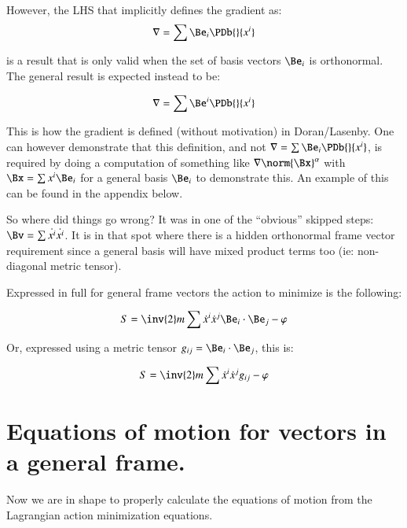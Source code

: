 However, the LHS that implicitly defines the gradient as:
\begin{equation*}
\grad = \sum \Be_i \PDb{}{x^i}
\end{equation*}

is a result that is only valid when the set of basis vectors $\Be_i$ is orthonormal.  The general result is
expected instead to be:

\begin{equation*}
\grad = \sum \Be^i \PDb{}{x^i}
\end{equation*}

This is how the gradient is defined (without motivation) in Doran/Lasenby.  One can however demonstrate that this definition, and not $\grad = \sum \Be_i \PDb{}{x^i}$, is required by doing a computation of something like $\grad \norm{\Bx}^\alpha$ with $\Bx = \sum x^i \Be_i$ for a general basis $\Be_i$ to demonstrate this.  An example of this can be found in the appendix below.

So where did things go wrong?  It was in one of the ``obvious'' skipped steps: $\Bv = \sum \dot{x^i} \dot{x^i}$.  It is in that
spot where there is a hidden orthonormal frame vector requirement since a general basis will have mixed product terms too
(ie: non-diagonal metric tensor).

Expressed in full for general frame vectors the action to minimize is the following:

\begin{equation}
S = \inv{2} m \sum \dot{x}^i \dot{x}^j \Be_i \cdot \Be_j -\varphi
\end{equation}

Or, expressed using a metric tensor $g_{ij} = \Be_i \cdot \Be_j$, this is:

\begin{equation}
S = \inv{2} m \sum \dot{x}^i \dot{x}^j g_{ij} -\varphi
\end{equation}

\section{Equations of motion for vectors in a general frame. }

Now we are in shape to properly calculate the equations of motion from the Lagrangian action minimization equations.

